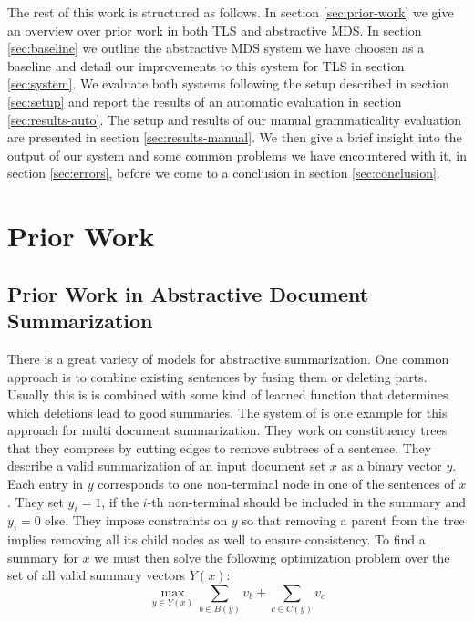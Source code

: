 \documentclass[a4paper,BCOR=10mm]{report}
\numberwithin{lemma}{chapter}
\numberwithin{definition}{chapter}
\begin{document}
The rest of this work is structured as follows.
In section \ref{sec:prior-work} we give an overview over prior work in both TLS and abstractive MDS.
In section \ref{sec:baseline} we outline the abstractive MDS system we have choosen as a baseline and detail our improvements to this system for TLS in section \ref{sec:system}.
We evaluate both systems following the setup described in 
section \ref{sec:setup} and report the results of an automatic evaluation in section \ref{sec:results-auto}.
The setup and results of our manual grammaticality evaluation are presented in section \ref{sec:results-manual}.
We then give a brief insight into the output of our system and some common problems we have encountered with it, in section \ref{sec:errors}, before we come to a conclusion in section \ref{sec:conclusion}.



\chapter{Prior Work}

\section{Prior Work in Abstractive Document Summarization}

There is a great variety of models for abstractive summarization. One common approach is to combine existing sentences by fusing them or deleting parts. Usually this is is combined with some kind of learned function that determines which deletions lead to good summaries.
The system of \citet{berg-kirkpatrick} is one example for this approach for multi document summarization. They work on constituency trees that they compress by cutting edges to remove subtrees of a sentence.
They describe a valid summarization of an input document set $x$ as a binary vector $y$. Each entry in $y$ corresponds to one non-terminal node in one of the sentences of $x$. They set $y_i = 1$, if the $i$-th non-terminal should be included in the summary and $y_i = 0$ else. They impose constraints on $y$ so that removing a parent from the tree implies removing all its child nodes as well to ensure consistency.
To find a summary for $x$ we must then solve the following optimization problem over the set of all valid summary vectors $Y(x)$:
\begin{equation}
\max_{y \in Y(x)} \sum_{b \in B(y)} v_b + \sum_{c \in C(y)} v_c
\end{equation}
\end{document}
